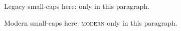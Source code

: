 Legacy small-caps here: \sc only in this paragraph.

Modern small-caps here: \textsc{modern} only in this paragraph.

